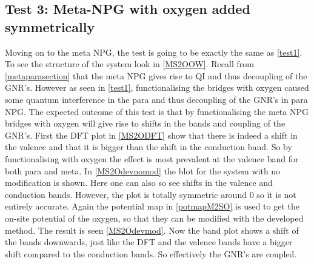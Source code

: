 \subsection{Test 3: Meta-NPG with oxygen added symmetrically}\label{test3}
Moving on to the meta NPG, the test is going to be exactly the same as \cref{test1}. To see the structure of the system look in \cref{MS2OOW}. Recall from \cref{metaparasection} that the meta NPG gives rise to QI and thus decoupling of the GNR's. However as seen in \cref{test1}, functionalising the bridges with oxygen caused some quantum interference in the para and thus decoupling of the GNR's in para NPG. The expected outcome of this test is that by functionalising the meta NPG bridges with oxygen will give rise to shifts in the bands and coupling of the GNR's. First the DFT plot in \cref{MS2ODFT} show that there is indeed a shift in the valence and that it is bigger than the shift in the conduction band. So by functionalising with oxygen the effect is most prevalent at the valence band for both para and meta. In \cref{MS2Odevnomod} the blot for the system with no modification is shown. Here one can also so see shifts in the valence and conduction bands. However, the plot is totally symmetric around 0 so it is not entirely accurate. Again the potential map in \cref{potmapM2SO} is used to get the on-site potential of the oxygen, so that they can be modified with the developed method. The result is seen \cref{MS2Odevmod}. Now the band plot shows a shift of the bands downwards, just like the DFT and the valence bands have a bigger shift compared to the conduction bands. So effectively the GNR's are coupled.
